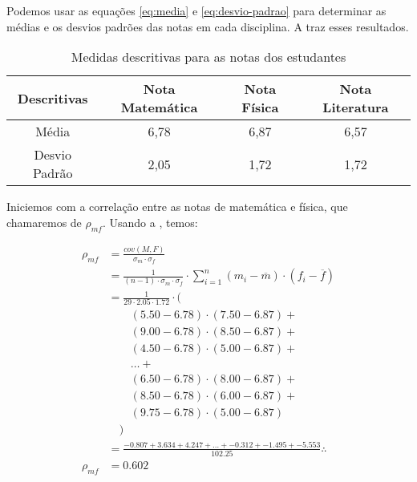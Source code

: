\begin{sol}
Podemos usar as equações \ref{eq:media} e \ref{eq:desvio-padrao} para
determinar as médias e os desvios padrões das notas em cada disciplina. A
 traz esses resultados.

\begin{table}
    \centering
    \begin{tabular}{cccc}
    \toprule
    Descritivas   & Nota Matemática & Nota Física & Nota Literatura \\
    \midrule
    Média         & 6,78            & 6,87        & 6,57            \\
    Desvio Padrão & 2,05            & 1,72        & 1,72            \\
    \bottomrule
    \end{tabular}
    \caption{Medidas descritivas para as notas dos estudantes}
    \label{tab:notas-estudantes-descritivas}
\end{table}

Iniciemos com a correlação entre as notas de matemática e física, que
chamaremos de $\rho_{mf}$. Usando a , temos:

\begin{align*}
    \rho_{mf} &=
        \frac{cov(M,F)}{\sigma_m \cdot \sigma_f} \\
    &= \frac{1}{(n-1) \cdot \sigma_m \cdot \sigma_f} \cdot
        \sum_{i=1}^{n} (m_i - \overline{m}) \cdot (f_i - \overline{f}) \\
    &= \frac{1}{29 \cdot 2.05 \cdot 1.72} \cdot \Big( \\
            & \quad \quad (5.50 - 6.78) \cdot (7.50 - 6.87) + \\
            & \quad \quad (9.00 - 6.78) \cdot (8.50 - 6.87) + \\
            & \quad \quad (4.50 - 6.78) \cdot (5.00 - 6.87) + \\
            & \quad \quad \ldots + \\
            & \quad \quad (6.50 - 6.78) \cdot (8.00 - 6.87) + \\
            & \quad \quad (8.50 - 6.78) \cdot (6.00 - 6.87) + \\
            & \quad \quad (9.75 - 6.78) \cdot (5.00 - 6.87) \\
            & \quad \Big) \\
    &= \frac{-0.807 + 3.634 + 4.247 + \ldots + -0.312 + -1.495 + -5.553}{102.25} \therefore \\
    \rho_{mf} &= 0.602
\end{align*}


\end{sol}

